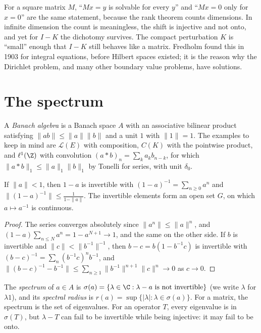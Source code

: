 \begin{beauty}
For a square matrix $M$, ``$Mx=y$ is solvable for every $y$'' and ``$Mx=0$ only for $x=0$'' are the same statement, because the rank theorem counts dimensions. In infinite dimension the count is meaningless, the shift
is injective and not onto, and yet for $I-K$ the dichotomy survives. The compact perturbation $K$ is ``small'' enough that $I-K$ still behaves like a matrix. Fredholm found this in 1903 for integral equations, before
Hilbert spaces existed; it is the reason why the Dirichlet problem, and many other boundary value problems, have solutions.
\end{beauty}

\section{The spectrum}

A \emph{Banach algebra} is a Banach space $A$ with an associative bilinear product satisfying $\|ab\|\le\|a\|\|b\|$ and a unit $1$ with $\|1\|=1$. The examples to keep in mind are $\mathcal L(E)$ with composition, $C(K)$ with the
pointwise product, and $\ell^1(\Z)$ with convolution $(a*b)_n=\sum_ka_kb_{n-k}$, for which $\|a*b\|_1\le\|a\|_1\|b\|_1$ by Tonelli for series, with unit $\delta_0$.

\begin{lemma}\label{lem:neumann}
If $\|a\|<1$, then $1-a$ is invertible with $(1-a)^{-1}=\sum_{n\ge0}a^n$ and $\|(1-a)^{-1}\|\le\frac1{1-\|a\|}$. The invertible elements form an open set $G$, on which $a\mapsto a^{-1}$ is continuous.
\end{lemma}
\begin{proof}
The series converges absolutely since $\|a^n\|\le\|a\|^n$, and $(1-a)\sum_{n\le N}a^n=1-a^{N+1}\to1$, and the same on the other side. If $b$ is invertible and $\|c\|<\|b^{-1}\|^{-1}$, then $b-c=b(1-b^{-1}c)$ is invertible with
$(b-c)^{-1}=\sum_n(b^{-1}c)^nb^{-1}$, and $\|(b-c)^{-1}-b^{-1}\|\le\sum_{n\ge1}\|b^{-1}\|^{n+1}\|c\|^n\to0$ as $c\to0$.
\end{proof}

The \emph{spectrum} of $a\in A$ is $\sigma(a)=\{\lambda\in\C:\lambda-a\text{ is not invertible}\}$ (we write $\lambda$ for $\lambda1$), and its \emph{spectral radius} is $r(a)=\sup\{|\lambda|:\lambda\in\sigma(a)\}$. For a matrix, the
spectrum is the set of eigenvalues. For an operator $T$, every eigenvalue is in $\sigma(T)$, but $\lambda-T$ can fail to be invertible while being injective: it may fail to be onto.

